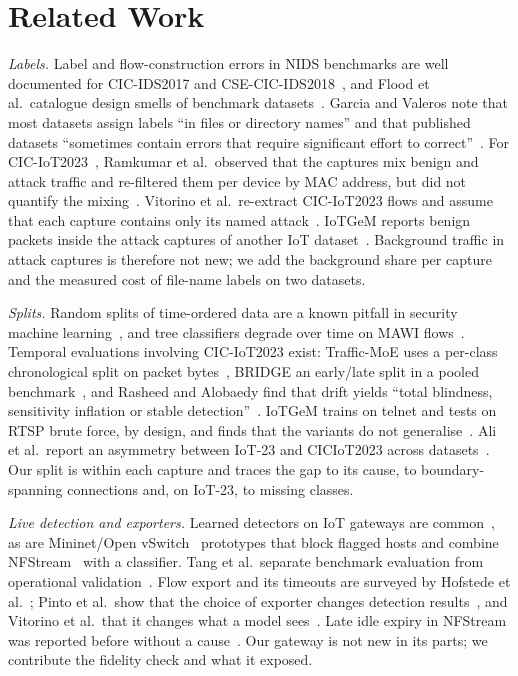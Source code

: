 \section{Related Work}\label{sec:related}

\emph{Labels.} Label and flow-construction errors in NIDS benchmarks are well documented for CIC-IDS2017 and CSE-CIC-IDS2018~\cite{engelen2021troubleshooting,liu2022error}, and Flood et al.\ catalogue design smells of benchmark datasets~\cite{flood2024smells}. Garcia and Valeros note that most datasets assign labels ``in files or directory names'' and that published datasets ``sometimes contain errors that require significant effort to correct''~\cite{garcia2023labeling}. For CIC-IoT2023~\cite{neto2023ciciot2023}, Ramkumar et al.\ observed that the captures mix benign and attack traffic and re-filtered them per device by MAC address, but did not quantify the mixing~\cite{ramkumar2024diagnosing}. Vitorino et al.\ re-extract CIC-IoT2023 flows and assume that each capture contains only its named attack~\cite{vitorino2025revisiting}. IoTGeM reports benign packets inside the attack captures of another IoT dataset~\cite{kostas2024iotgem}. Background traffic in attack captures is therefore not new; we add the background share per capture and the measured cost of file-name labels on two datasets.

\emph{Splits.} Random splits of time-ordered data are a known pitfall in security machine learning~\cite{arp2022dos,pendlebury2019tesseract,apruzzese2023sok}, and tree classifiers degrade over time on MAWI flows~\cite{schraven2026mawiflow}. Temporal evaluations involving CIC-IoT2023 exist: Traffic-MoE uses a per-class chronological split on packet bytes~\cite{zhou2026trafficmoe}, BRIDGE an early/late split in a pooled benchmark~\cite{bridge2026tchnet}, and Rasheed and Alobaedy find that drift yields ``total blindness, sensitivity inflation or stable detection''~\cite{rasheed2026drift}. IoTGeM trains on telnet and tests on RTSP brute force, by design, and finds that the variants do not generalise~\cite{kostas2024iotgem}. Ali et al.\ report an asymmetry between IoT-23 and CICIoT2023 across datasets~\cite{ali2026siamxbert}. Our split is within each capture and traces the gap to its cause, to boundary-spanning connections and, on IoT-23, to missing classes.

\emph{Live detection and exporters.} Learned detectors on IoT gateways are common~\cite{realguard2022}, as are Mininet/Open vSwitch~\cite{lantz2010mininet,pfaff2015ovs} prototypes that block flagged hosts and combine NFStream~\cite{aouini2022nfstream} with a classifier. Tang et al.\ separate benchmark evaluation from operational validation~\cite{tang2026hybrid}. Flow export and its timeouts are surveyed by Hofstede et al.~\cite{hofstede2014flow}; Pinto et al.\ show that the choice of exporter changes detection results~\cite{pinto2025flowexporter,pinto2025hera}, and Vitorino et al.\ that it changes what a model sees~\cite{vitorino2025revisiting}. Late idle expiry in NFStream was reported before without a cause~\cite{nfstream120}. Our gateway is not new in its parts; we contribute the fidelity check and what it exposed.


